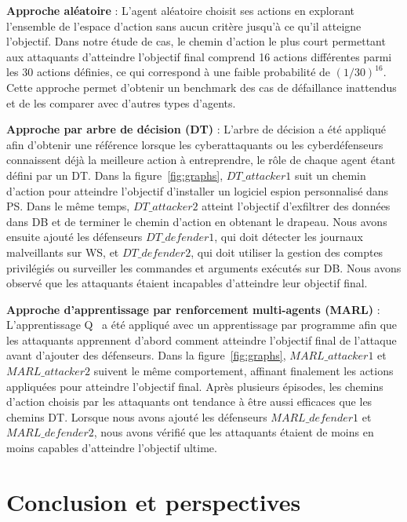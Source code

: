 \noindent
\textbf{Approche aléatoire} : \quad L'agent aléatoire choisit ses actions en explorant l'ensemble de l'espace d'action sans aucun critère jusqu'à ce qu'il atteigne l'objectif. Dans notre étude de cas, le chemin d'action le plus court permettant aux attaquants d'atteindre l'objectif final comprend 16 actions différentes parmi les 30 actions définies, ce qui correspond à une faible probabilité de $(1/30)^{16}$.
Cette approche permet d'obtenir un benchmark des cas de défaillance inattendus et de les comparer avec d'autres types d'agents.

\noindent
\textbf{Approche par arbre de décision (DT) } : \quad L'arbre de décision a été appliqué afin d'obtenir une référence lorsque les cyberattaquants ou les cyberdéfenseurs connaissent déjà la meilleure action à entreprendre, le rôle de chaque agent étant défini par un DT.
Dans la figure~\ref{fig:graphs}, $DT\_attacker1$ suit un chemin d'action pour atteindre l'objectif d'installer un logiciel espion personnalisé dans PS. Dans le même temps, $DT\_attacker2$ atteint l'objectif d'exfiltrer des données dans DB et de terminer le chemin d'action en obtenant le drapeau. Nous avons ensuite ajouté les défenseurs $DT\_defender1$, qui doit détecter les journaux malveillants sur WS, et $DT\_defender2$, qui doit utiliser la gestion des comptes privilégiés ou surveiller les commandes et arguments exécutés sur DB. Nous avons observé que les attaquants étaient incapables d'atteindre leur objectif final.

\noindent
\textbf{Approche d'apprentissage par renforcement multi-agents (MARL)} : \quad L'apprentissage Q~\cite{CWatkins1992} a été appliqué avec un apprentissage par programme afin que les attaquants apprennent d'abord comment atteindre l'objectif final de l'attaque avant d'ajouter des défenseurs.
Dans la figure~\ref{fig:graphs}, $MARL\_attacker1$ et $MARL\_attacker2$ suivent le même comportement, affinant finalement les actions appliquées pour atteindre l'objectif final. Après plusieurs épisodes, les chemins d'action choisis par les attaquants ont tendance à être aussi efficaces que les chemins DT. Lorsque nous avons ajouté les défenseurs $MARL\_defender1$ et $MARL\_defender2$, nous avons vérifié que les attaquants étaient de moins en moins capables d'atteindre l'objectif ultime.


\section{Conclusion et perspectives}

